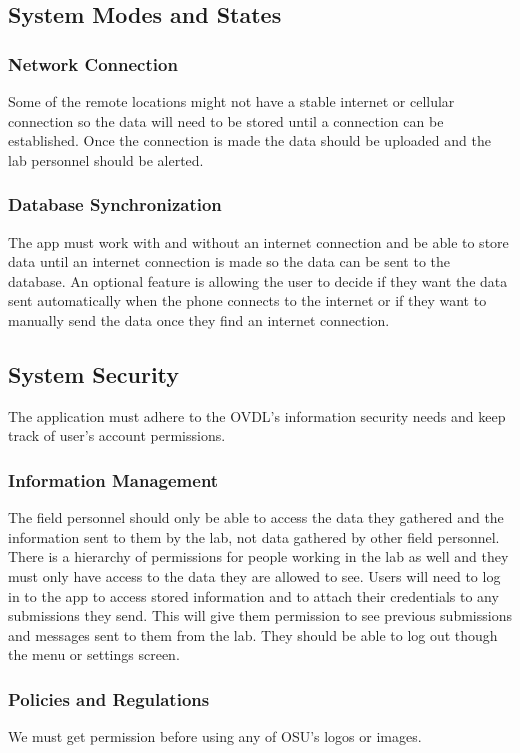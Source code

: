 \documentclass[onecolumn, draftclsnofoot,10pt, compsoc]{IEEEtran}
\begin{document}
\subsection{System Modes and States}
\subsubsection{Network Connection}
Some of the remote locations might not have a stable internet or cellular connection so the data will need to be stored until a connection can be established. Once the connection is made the data should be uploaded and the lab personnel should be alerted. 

\subsubsection{Database Synchronization}
The app must work with and without an internet connection and be able to store data until an internet connection is made so the data can be sent to the database. 
An optional feature is allowing the user to decide if they want the data sent automatically when the phone connects to the internet or if they want to manually send the data once they find an internet connection.

\subsection{System Security}
The application must adhere to the OVDL's information security needs and keep track of user’s account permissions. 

\subsubsection{Information Management}
The field personnel should only be able to access the data they gathered and the information sent to them by the lab, not data gathered by other field personnel. 
There is a hierarchy of permissions for people working in the lab as well and they must only have access to the data they are allowed to see. 
Users will need to log in to the app to access stored information and to attach their credentials to any submissions they send. 
This will give them permission to see previous submissions and messages sent to them from the lab. 
They should be able to log out though the menu or settings screen.

\subsubsection{Policies and Regulations}
We must get permission before using any of OSU's logos or images. 
\end{document}
